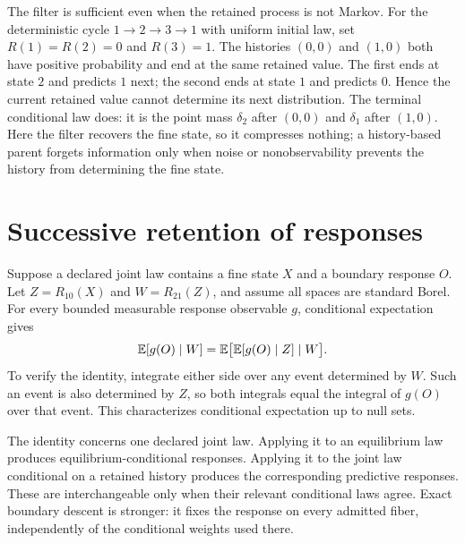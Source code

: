 The filter is sufficient even when the retained process is not Markov.
For the deterministic cycle $1\to2\to3\to1$ with uniform initial law,
set $R(1)=R(2)=0$ and $R(3)=1$. The histories $(0,0)$ and $(1,0)$
both have positive probability and end at the same retained value.
The first ends at state $2$ and predicts $1$ next; the second ends at
state $1$ and predicts $0$. Hence the current retained value cannot
determine its next distribution. The terminal conditional law does: it is
the point mass $\delta_2$ after $(0,0)$ and $\delta_1$ after $(1,0)$. Here the
filter recovers the fine state, so it compresses nothing; a history-based
parent forgets information only when noise or nonobservability prevents the
history from determining the fine state.

\section{Successive retention of responses}

Suppose a declared joint law contains a fine state $X$ and a boundary
response $O$. Let $Z=R_{10}(X)$ and $W=R_{21}(Z)$, and assume all spaces
are standard Borel. For every bounded measurable response observable $g$,
conditional expectation gives
\begin{equation}
 \mathbb E[g(O)\mid W]
 =\mathbb E\bigl[\mathbb E[g(O)\mid Z]\mid W\bigr].
 \label{sinh:conditional-tower}
\end{equation}
To verify the identity, integrate either side over any event determined by
$W$. Such an event is also determined by $Z$, so both integrals equal
the integral of $g(O)$ over that event. This characterizes conditional
expectation up to null sets.

The identity concerns one declared joint law. Applying it to an equilibrium
law produces equilibrium-conditional responses. Applying it to the joint
law conditional on a retained history produces the corresponding predictive
responses. These are interchangeable only when their relevant conditional
laws agree. Exact boundary descent is stronger: it fixes the response on
every admitted fiber, independently of the conditional weights used there.
